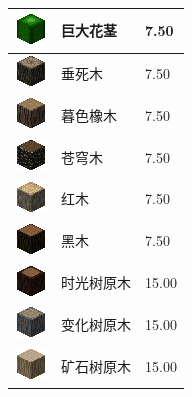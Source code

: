 \documentclass[UTF8]{ctexart}
\begin{document}
\begin{longtable}[]{|p{1cm}|p{8cm}|p{1.5cm}|}
	\hline
	\includegraphics{.workspace/icons/biomesoplenty/biomesoplenty__log_4__4.png} & 巨大花茎 &7.50\\
	\hline
	\includegraphics{.workspace/icons/biomesoplenty/biomesoplenty__log_4__5.png} & 垂死木 &7.50\\
	\hline
	\includegraphics{.workspace/icons/twilightforest/twilightforest__twilight_log__0.png} & 暮色橡木 &7.50\\
	\hline
	\includegraphics{.workspace/icons/twilightforest/twilightforest__twilight_log__1.png} & 苍穹木 &7.50\\
	\hline
	\includegraphics{.workspace/icons/twilightforest/twilightforest__twilight_log__2.png} & 红木 &7.50\\
	\hline
	\includegraphics{.workspace/icons/twilightforest/twilightforest__twilight_log__3.png} & 黑木 &7.50\\
	\hline
	\includegraphics{.workspace/icons/twilightforest/twilightforest__magic_log__0.png} & 时光树原木 &15.00\\
	\hline
	\includegraphics{.workspace/icons/twilightforest/twilightforest__magic_log__1.png} & 变化树原木 &15.00\\
	\hline
	\includegraphics{.workspace/icons/twilightforest/twilightforest__magic_log__2.png} & 矿石树原木 &15.00\\

\end{longtable}
\end{document}
